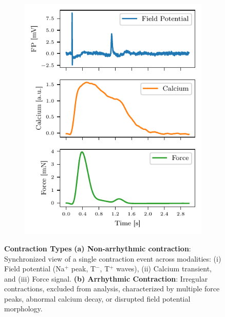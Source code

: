 \documentclass{report}
\begin{document}
\begin{figure}[H]
\begin{subfigure}[b]{0.4\textwidth}
                    \includegraphics[width=\textwidth]{plots/chapter_3/single_arrythmic_contraction_plot.pdf}
                    \caption[Arrhythmic contraction]{}
                    \label{fig:arrhythmic-contraction}
                \end{subfigure}
                \caption[Contraction Types]{\textbf{Contraction Types} \textbf{(a) Non-arrhythmic contraction}: Synchronized view of a single contraction event across modalities: (i) Field potential (Na$^+$ peak, T$^-$, T$^+$ waves), (ii) Calcium transient, and (iii) Force signal. \textbf{(b) Arrhythmic Contraction}: Irregular contractions, excluded from analysis, characterized by multiple force peaks, abnormal calcium decay, or disrupted field potential morphology.}
            \end{figure}
\end{document}
